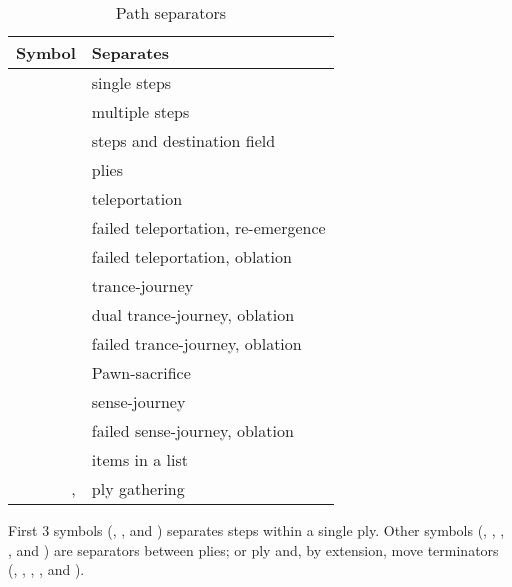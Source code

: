 \begin{table}[!h]
\centering
\begin{tabular}{ rl }
\toprule %
\textbf{Symbol}      & \textbf{Separates}                         \\
\midrule %
\alg{.}              & single steps                               \\
\alg{..}             & multiple steps                             \\
\alg{-}              & steps and destination field                \\
\cmidrule{1-2} %
\alg{\~{}}           & plies                                      \\
\alg{|}              & teleportation                              \\
\alg{||}             & failed teleportation, re-emergence         \\
\alg{|||}            & failed teleportation, oblation             \\
\alg{@}              & trance-journey                             \\
\alg{@@}             & dual trance-journey, oblation              \\
\alg{@@@}            & failed trance-journey, oblation            \\
\alg{;;}             & Pawn-sacrifice                             \\
\alg{"}              & sense-journey                              \\
\alg{'}              & failed sense-journey, oblation             \\
\cmidrule{1-2} %
\alg{,}              & items in a list                            \\
\alg{[}, \alg{]}     & ply gathering                              \\
\bottomrule %
\end{tabular}
\caption{Path separators}
\label{tbl:Appendix/Summary/Path separators}
\end{table}

First 3 symbols (, , and \alg{-}) separates steps within a single ply.
Other symbols (\alg{\~{}}, \alg{|}, , \alg{;;}, and ) are separators
between plies; or ply and, by extension, move terminators (\alg{||}, \alg{|||}, ,
, and ).

